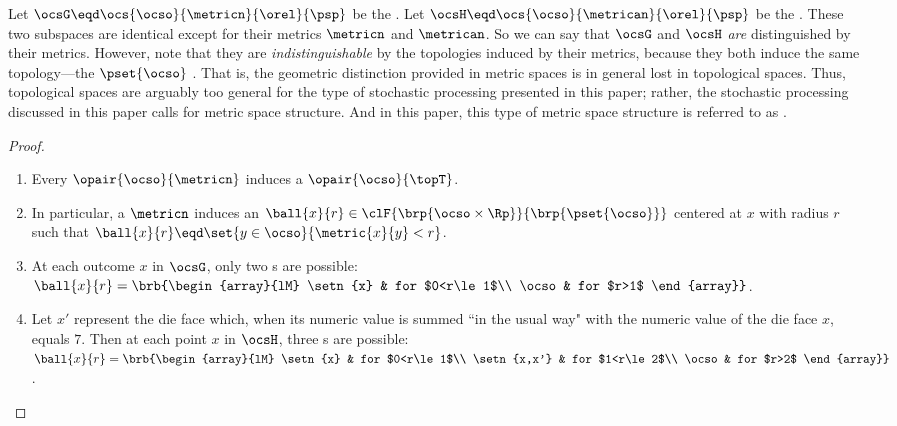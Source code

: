 \begin{tabstr}{0.75}
\begin{remark}
\label{rem:dietop}
\label{rem:mgeo}
Let $\ocsG\eqd\ocs{\ocso}{\metricn} {\orel}{\psp}$ be the  .
Let $\ocsH\eqd\ocs{\ocso}{\metrican}{\orel}{\psp}$ be the  .
These two subspaces are identical except for their metrics $\metricn$ and $\metrican$.
So we can say that $\ocsG$ and $\ocsH$ \emph{are} distinguished by their metrics.
However, note that they are \emph{indistinguishable} by the topologies induced by their metrics,
because they both induce the same topology---the  $\pset{\ocso}$ .
That is, the geometric distinction provided in metric spaces is in general lost in topological spaces.
Thus, topological spaces are arguably too general for the type of stochastic processing presented in this paper;
rather, the stochastic processing discussed in this paper calls for metric space structure.
And in this paper, this type of metric space structure is referred to as .
\end{remark}
\begin{proof}
\begin{enumerate}
  \item Every  $\opair{\ocso}{\metricn}$  
        induces a  $\opair{\ocso}{\topT}$.
  \item In particular, a  $\metricn$ induces an  
        $\ball{x}{r}\in\clF{\brp{\ocso\times\Rp}}{\brp{\pset{\ocso}}}$ centered at $x$ with radius $r$ such that 
        $\ball{x}{r}\eqd\set{y\in\ocso}{\metric{x}{y}<r}$.
  \item At each outcome $x$ in $\ocsG$, only two s are possible:
        $\ball{x}{r}=\brb{\begin{array}{lM}
                            \setn{x}  & for $0<r\le1$\\
                            \ocso     & for $r>1$
                          \end{array}}$.
  \item Let $x'$ represent the die face which, 
        when its numeric value is summed ``in the usual way" with the numeric value of the die face $x$,
        equals $7$.
        Then at each point $x$ in $\ocsH$, three s are possible:\\
        $\ball{x}{r}=\brb{\begin{array}{lM}
                             \setn{x}     & for $0<r\le1$\\
                             \setn{x,x'}  & for $1<r\le2$\\
                             \ocso        & for $r>2$
                           \end{array}}$.


\end{enumerate}
\end{proof}
\end{tabstr}
